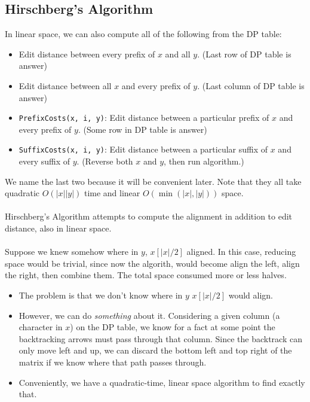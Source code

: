 \documentclass[10pt]{article}
\begin{document}
\subsection*{Hirschberg's Algorithm}
In linear space, we can also compute all of the following from the DP table:
\begin{itemize}
	\item Edit distance between every prefix of $x$ and all $y$.  (Last row of DP table is answer)
	\item Edit distance between all $x$ and every prefix of $y$.  (Last column of DP table is answer)
	\item \texttt{PrefixCosts(x, i, y)}: Edit distance between a particular prefix of $x$ and every prefix of $y$.  (Some row in DP table is answer)
	\item \texttt{SuffixCosts(x, i, y)}: Edit distance between a particular suffix of $x$ and every suffix of $y$.  (Reverse both $x$ and $y$, then run algorithm.)
\end{itemize}
We name the last two because it will be convenient later.  Note that they all take quadratic $O(|x||y|)$ time and linear $O(\min(|x|, |y|))$ space.\\\\
Hirschberg's Algorithm attempts to compute the alignment in addition to edit distance, also in linear space.\\\\
Suppose we knew somehow where in $y$, $x[|x| / 2]$ aligned.  In this case, reducing space would be trivial, since now the algorith, would become align the left, align the right, then combine them.  The total space consumed more or less halves.
\begin{itemize}
	\item The problem is that we don't know where in $y$ $x[|x| / 2]$ would align.
	\item However, we can do \textit{something} about it.  Considering a given column (a character in $x$) on the DP table, we know for a fact at some point the backtracking arrows must pass through that column.  Since the backtrack can only move left and up, we can discard the bottom left and top right of the matrix if we know where that path passes through.
	\item Conveniently, we have a quadratic-time, linear space algorithm to find exactly that.
\end{itemize}
\end{document}
